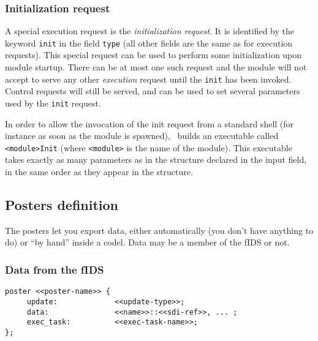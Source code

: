 \subsubsection{Initialization request}

A special execution request is the {\em initialization request}. It is
identified by the keyword {\tt init} in the field {\tt type} (all other
fields are the same as for execution requests).  This special request can
be used to perform some initialization upon module startup. There can be
at most one such request and the module will not accept to serve any
other {\em execution} request until the {\tt init} has been invoked.
Control requests will still be served, and can be used to set several
parameters used by the {\tt init} request.

In  order to allow the  invocation  of the init  request  from a standard
shell (for instance as soon as the  module is spawned), \GenoM\ builds an
executable called {\tt <module>Init} (where {\tt <module>} is the name of
the module). This executable takes exactly as
many parameters as in the structure  declared in the  input field, in the
same order as they appear in the structure.

\subsection{Posters definition}

The  posters let you export   data, either automatically  (you don't have
anything to do) or ``by hand'' inside  a codel.  Data may  be a member of
the fIDS or not.

\subsubsection{Data from the fIDS}

\begin{center}\begin{cartouche}\small\begin{verbatim}
poster <<poster-name>> {
     update:             <<update-type>>;
     data:               <<name>>::<<sdi-ref>>, ... ;
     exec_task:          <<exec-task-name>>;
};
\end{verbatim}\end{cartouche}\end{center}

